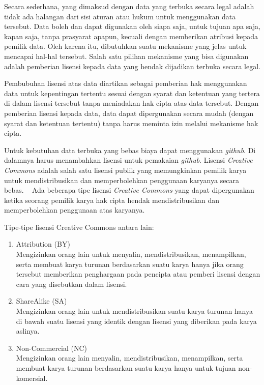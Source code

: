 Secara sederhana, yang dimaksud dengan data yang terbuka secara legal adalah tidak ada halangan dari sisi aturan atau hukum untuk menggunakan data tersebut. Data boleh dan dapat digunakan oleh siapa saja, untuk tujuan apa saja, kapan saja, tanpa prasyarat apapun, kecuali dengan memberikan atribusi kepada pemilik data. Oleh karena itu, dibutuhkan suatu mekanisme yang jelas untuk mencapai hal-hal tersebut. Salah satu pilihan mekanisme yang bisa digunakan adalah pemberian lisensi kepada data yang hendak dijadikan terbuka secara legal.   

Pembubuhan lisensi atas data diartikan sebagai pemberian hak menggunakan data untuk kepentingan tertentu sesuai dengan syarat dan ketentuan yang tertera di dalam lisensi tersebut tanpa meniadakan hak cipta atas data tersebut. Dengan pemberian lisensi kepada data, data dapat dipergunakan secara mudah (dengan syarat dan ketentuan tertentu) tanpa harus meminta izin melalui mekanisme hak cipta. 

Untuk kebutuhan data terbuka yang bebas biaya dapat menggunakan \textit{github}. Di dalamnya harus menambahkan lisensi untuk pemakaian \textit{github}. Lisensi \textit{Creative Commons} adalah salah satu lisensi publik yang memungkinkan pemilik karya untuk mendistribusikan dan memperbolehkan penggunaan karyanya secara bebas. ~\cite{creativecommons:06:lisensi} Ada beberapa tipe lisensi \textit{Creative Commons} yang dapat dipergunakan ketika seorang pemilik karya hak cipta hendak mendistribusikan dan memperbolehkan penggunaan atas karyanya.  

Tipe-tipe lisensi Creative Commons antara lain:
\begin{enumerate}
\item Attribution (BY) \\
Mengizinkan orang lain untuk menyalin, mendistribusikan, menampilkan, serta membuat karya turunan berdasarkan suatu karya hanya jika orang tersebut memberikan penghargaan pada pencipta atau pemberi lisensi dengan cara yang disebutkan dalam lisensi.
\item ShareAlike (SA) \\
Mengizinkan orang lain untuk mendistribusikan suatu karya turunan hanya di bawah suatu lisensi yang identik dengan lisensi yang diberikan pada karya aslinya. 
\item Non-Commercial (NC) \\
Mengizinkan orang lain menyalin, mendistribusikan, menampilkan, serta membuat karya turunan berdasarkan suatu karya hanya untuk tujuan non-komersial.
\end{enumerate}

